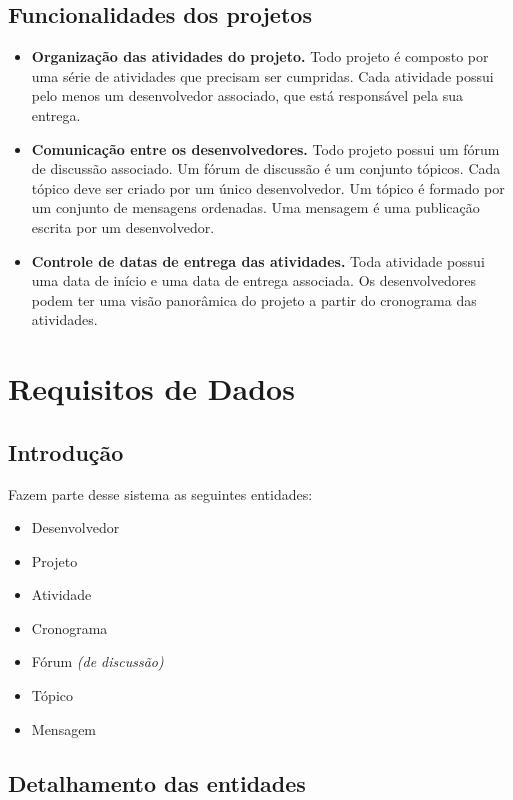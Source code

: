 \documentclass{article}
\begin{document}
	\subsection{Funcionalidades dos projetos}
	\begin{itemize}
		\item \textbf{Organização das atividades do projeto.} Todo projeto é composto por uma série de atividades que precisam ser cumpridas. Cada atividade possui pelo menos um desenvolvedor associado, que está responsável pela sua entrega.

		\item \textbf{Comunicação entre os desenvolvedores.} Todo projeto possui um fórum de discussão associado. Um fórum de discussão é um conjunto tópicos. Cada tópico deve ser criado por um único desenvolvedor. Um tópico é formado por um conjunto de mensagens ordenadas. Uma mensagem é uma publicação escrita por um desenvolvedor.

		\item \textbf{Controle de datas de entrega das atividades.} Toda atividade possui uma data de início e uma data de entrega associada. Os desenvolvedores podem ter uma visão panorâmica do projeto a partir do cronograma das atividades.
	\end{itemize}


\section{Requisitos de Dados}

	\subsection{Introdução}
	Fazem parte desse sistema as seguintes entidades:
	\begin{itemize}
		\item Desenvolvedor
		\item Projeto
		\item Atividade
		\item Cronograma
		\item Fórum \textit{(de discussão)}
		\item Tópico
		\item Mensagem
	\end{itemize}

	\subsection{Detalhamento das entidades}
\end{document}

